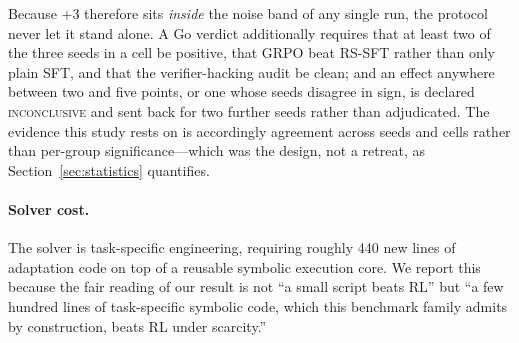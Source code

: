Because $+3$ therefore sits \emph{inside} the noise band of any single run, the
protocol never let it stand alone. A Go verdict additionally requires that at
least two of the three seeds in a cell be positive, that GRPO beat RS-SFT rather
than only plain SFT, and that the verifier-hacking audit be clean; and an effect
anywhere between two and five points, or one whose seeds disagree in sign, is
declared \textsc{inconclusive} and sent back for two further seeds rather than
adjudicated. The evidence this study rests on is accordingly agreement across
seeds and cells rather than per-group significance---which was the design, not a
retreat, as Section~\ref{sec:statistics} quantifies.

\paragraph{Solver cost.}
The solver is task-specific engineering, requiring roughly 440 new lines of
adaptation code on top of a reusable symbolic execution core. We report this
because the fair reading of our result is not ``a small script beats RL'' but
``a few hundred lines of task-specific symbolic code, which this benchmark
family admits by construction, beats RL under scarcity.''
